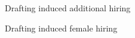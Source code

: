\begin{frame}{Drafting induced additional hiring}

\end{frame}

\begin{frame}{Drafting induced female hiring}

\end{frame}

